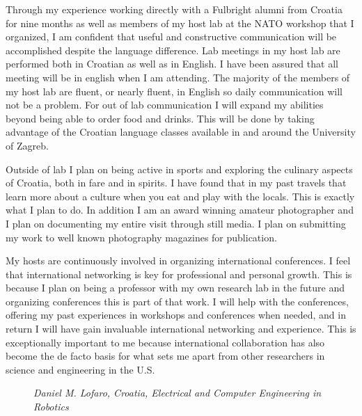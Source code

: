 \documentclass[12pt]{article}
\begin{document}
Through my experience working directly with a Fulbright alumni from Croatia for nine months as well as members of my host lab at the NATO workshop that I organized, I am confident that useful and constructive communication will be accomplished despite the language difference.  
Lab meetings in my host lab are performed both in Croatian as well as in English.  
I have been assured that all meeting will be in english when I am attending.
The majority of the members of my host lab are fluent, or nearly fluent, in English so daily communication will not be a problem.
For out of lab communication I will expand my abilities beyond being able to order food and drinks.
This will be done by taking advantage of the Croatian language classes available in and around the University of Zagreb. 


Outside of lab I plan on being active in sports and exploring the culinary aspects of Croatia, both in fare and in spirits.  
I have found that in my past travels that learn more about a culture when you eat and play with the locals.  
This is exactly what I plan to do.  
In addition I am an award winning amateur photographer and I plan on documenting my entire visit through still media.
I plan on submitting my work to well known photography magazines for publication.

My hosts are continuously involved in organizing international conferences.  
I feel that international networking is key for professional and personal growth.
This is because I plan on being a professor with my own research lab in the future and organizing conferences this is part of that work.
I will help with the conferences, offering my past experiences in workshops and conferences when needed, and in return I will have gain invaluable international networking and experience.
This is exceptionally important to me because international collaboration has also become the de facto basis for what sets me apart from other researchers in science and engineering in the U.S. 

\begin{figure*}[t]
\caption{\textit{Daniel M. Lofaro, Croatia, Electrical and Computer Engineering in Robotics}}
\end{figure*}
\end{document}
